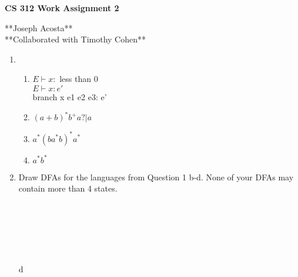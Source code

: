 \documentclass[11pt]{article}
\begin{document}
\begin{center}             %
\begin{LARGE}
{\bf CS 312 Work Assignment 2}
\end{LARGE}
\vskip 0.25cm      %

**Joseph Acosta**\\
**Collaborated with Timothy Cohen**\\
\end{center}

\begin{enumerate}

\item 
\begin{enumerate}
\item $E\vdash x:$ less than 0\\
	  \underline{$E\vdash x: e'$}\\
	  branch x {e1 e2 e3}: e'
\item $(a+b)^*b^+a?|a$\\
\item $a^*(ba^*b)^*a^*$\\
\item $a^*b^*$\\
\end{enumerate}

\item Draw DFAs for the languages from Question 1 b-d. None of your DFAs
may contain more than 4 states.
\\
\\
\\
\\
\\
\\
\\    d
\\
\\
\\
\\
\\\\
\\
\\
\\
\\
\\
\\\\
\\
\\
\\
\\
\\
\\
\\
\\
\\
\\


\end{enumerate}
\end{document}

